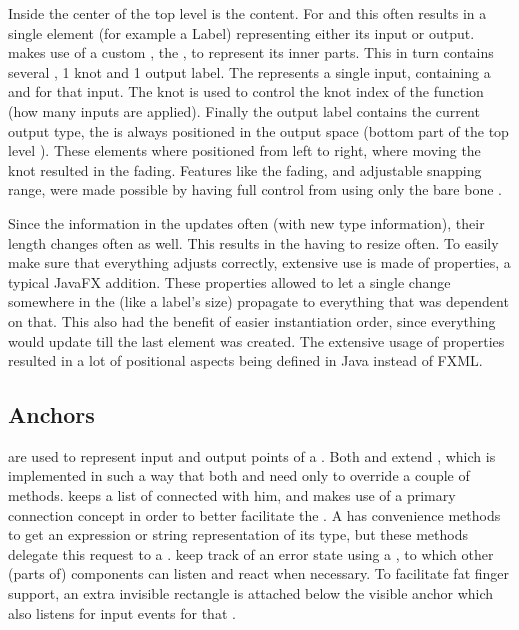Inside the center of the top level  is the  content. For  and  this often results in a single element (for example a Label) representing either its input or output.  makes use of a custom , the , to represent its inner parts. This  in turn contains several , 1 knot and 1 output label. The  represents a single input, containing a  and  for that input. The knot is used to control the knot index of the function (how many inputs are applied). Finally the output label contains the current output type, the  is always positioned in the output space (bottom part of the top level ). These elements where positioned from left to right, where moving the knot resulted in the  fading. Features like the fading, and adjustable snapping range, were made possible by having full control from using only the bare bone .

Since the information in the  updates often (with new type information), their length changes often as well. This results in the  having to resize often. To easily make sure that everything adjusts correctly, extensive use is made of properties, a typical JavaFX addition. These properties allowed to let a single change somewhere in the  (like a label's size) propagate to everything that was dependent on that. This also had the benefit of easier instantiation order, since everything would update till the last element was created. The extensive usage of properties resulted in a lot of positional aspects being defined in Java instead of FXML.

\subsection{Anchors}
 are used to represent input and output points of a . Both  and  extend , which is implemented in such a way that both  and  need only to override a couple of methods.  keeps a list of  connected with him, and makes use of a primary connection concept in order to better facilitate the . A  has convenience methods to get an expression or string representation of its type, but these methods delegate this request to a .  keep track of an error state using a , to which other (parts of) components can listen and react when necessary. To facilitate fat finger support, an extra invisible rectangle is attached below the visible anchor which also listens for input events for that .

